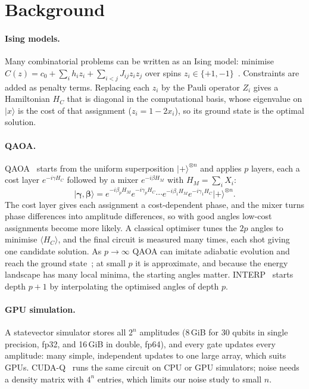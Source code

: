 
\section{Background}
\label{sec:background}

\paragraph{Ising models.}
Many combinatorial problems can be written as an Ising model: minimise $C(z) = c_0 + \sum_i h_i z_i + \sum_{i<j} J_{ij} z_i z_j$ over spins $z_i \in \{+1, -1\}$~\cite{lucas2014}.
Constraints are added as penalty terms.
Replacing each $z_i$ by the Pauli operator $Z_i$ gives a Hamiltonian $H_C$ that is diagonal in the computational basis, whose eigenvalue on $\lvert x \rangle$ is the cost of that assignment ($z_i = 1 - 2x_i$), so its ground state is the optimal solution.

\paragraph{QAOA.}
QAOA~\cite{farhi2014} starts from the uniform superposition $\lvert + \rangle^{\otimes n}$ and applies $p$ layers, each a cost layer $e^{-i\gamma H_C}$ followed by a mixer $e^{-i\beta H_M}$ with $H_M = \sum_i X_i$:
\begin{equation}
  \lvert \boldsymbol\gamma, \boldsymbol\beta \rangle
  = e^{-i\beta_p H_M} e^{-i\gamma_p H_C} \cdots e^{-i\beta_1 H_M} e^{-i\gamma_1 H_C} \lvert + \rangle^{\otimes n}.
\end{equation}
The cost layer gives each assignment a cost-dependent phase, and the mixer turns phase differences into amplitude differences, so with good angles low-cost assignments become more likely.
A classical optimiser tunes the $2p$ angles to minimise $\langle H_C \rangle$, and the final circuit is measured many times, each shot giving one candidate solution.
As $p \to \infty$ QAOA can imitate adiabatic evolution and reach the ground state~\cite{farhi2014}; at small $p$ it is approximate, and because the energy landscape has many local minima, the starting angles matter.
INTERP~\cite{zhou2020} starts depth $p + 1$ by interpolating the optimised angles of depth $p$.

\paragraph{GPU simulation.}
A statevector simulator stores all $2^n$ amplitudes (8\,GiB for 30 qubits in single precision, fp32, and 16\,GiB in double, fp64), and every gate updates every amplitude: many simple, independent updates to one large array, which suits GPUs.
CUDA-Q~\cite{cudaq} runs the same circuit on CPU or GPU simulators; noise needs a density matrix with $4^n$ entries, which limits our noise study to small $n$.
